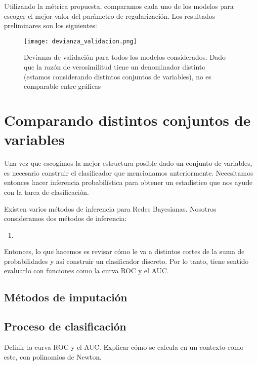 Utilizando la métrica propuesta, comparamos cada uno de los modelos para escoger el mejor valor del parámetro de regularización. Los resultados preliminares son los siguientes:
\begin{figure}[h]
    \caption{Devianza de validación para todos los modelos considerados. Dado que la razón de verosimilitud tiene un denominador distinto (estamos considerando distintos conjuntos de variables), no es comparable entre gráficas}
    \texttt{[image: devianza\_validacion.png]}
\end{figure}
\section*{Comparando distintos conjuntos de variables}
Una vez que escogimos la mejor estructura posible dado un conjunto de variables, es necesario construir el clasificador que mencionamos anteriormente. Necesitamos entonces hacer inferencia probabilística para obtener un estadístico que nos ayude con la tarea de clasificación.
\par
\noindent
Existen varios métodos de inferencia para Redes Bayesianas. Nosotros consideramos dos métodos de inferencia:
\begin{enumerate}
    \item
\end{enumerate}

Entonces, lo que hacemos es revisar cómo le va a distintos cortes de la suma de probabilidades y así construir un clasificador discreto. Por lo tanto, tiene sentido evaluarlo con funciones como la curva ROC y el AUC.
\subsection*{Métodos de imputación}
\subsection*{Proceso de clasificación}
Definir la curva ROC y el AUC. Explicar cómo se calcula en un contexto como este, con polinomios de Newton.

